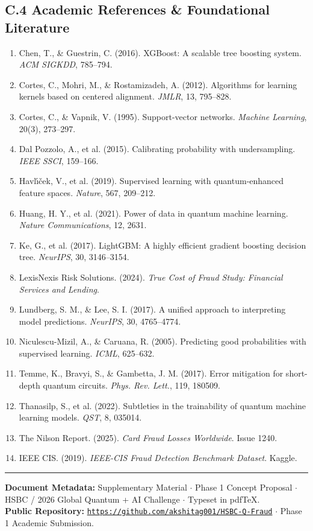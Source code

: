 \documentclass[10pt,a4paper]{article}
\begin{document}
\subsection*{C.4 Academic References \& Foundational Literature}
\begin{enumerate}[leftmargin=*,itemsep=0pt,topsep=0pt]
\item Chen, T., \& Guestrin, C. (2016). XGBoost: A scalable tree boosting system. \textit{ACM SIGKDD}, 785--794.
\item Cortes, C., Mohri, M., \& Rostamizadeh, A. (2012). Algorithms for learning kernels based on centered alignment. \textit{JMLR}, 13, 795--828.
\item Cortes, C., \& Vapnik, V. (1995). Support-vector networks. \textit{Machine Learning}, 20(3), 273--297.
\item Dal Pozzolo, A., et al. (2015). Calibrating probability with undersampling. \textit{IEEE SSCI}, 159--166.
\item Havl{\'\i}{\v{c}}ek, V., et al. (2019). Supervised learning with quantum-enhanced feature spaces. \textit{Nature}, 567, 209--212.
\item Huang, H. Y., et al. (2021). Power of data in quantum machine learning. \textit{Nature Communications}, 12, 2631.
\item Ke, G., et al. (2017). LightGBM: A highly efficient gradient boosting decision tree. \textit{NeurIPS}, 30, 3146--3154.
\item LexisNexis Risk Solutions. (2024). \textit{True Cost of Fraud Study: Financial Services and Lending}.
\item Lundberg, S. M., \& Lee, S. I. (2017). A unified approach to interpreting model predictions. \textit{NeurIPS}, 30, 4765--4774.
\item Niculescu-Mizil, A., \& Caruana, R. (2005). Predicting good probabilities with supervised learning. \textit{ICML}, 625--632.
\item Temme, K., Bravyi, S., \& Gambetta, J. M. (2017). Error mitigation for short-depth quantum circuits. \textit{Phys. Rev. Lett.}, 119, 180509.
\item Thanasilp, S., et al. (2022). Subtleties in the trainability of quantum machine learning models. \textit{QST}, 8, 035014.
\item The Nilson Report. (2025). \textit{Card Fraud Losses Worldwide}. Issue 1240.
\item IEEE CIS. (2019). \textit{IEEE-CIS Fraud Detection Benchmark Dataset}. Kaggle.
\end{enumerate}

\vspace{1.5pt}
\noindent\rule{\linewidth}{0.4pt}
\vspace{1pt}
{\color{darkslate}
\textbf{Document Metadata:} Supplementary Material $\cdot$ Phase 1 Concept Proposal $\cdot$ HSBC / 2026 Global Quantum + AI Challenge $\cdot$ Typeset in pdf\TeX.\\
\textbf{Public Repository:} \href{https://github.com/akshitag001/HSBC-Q-Fraud}{\texttt{https://github.com/akshitag001/HSBC-Q-Fraud}} $\cdot$ Phase 1 Academic Submission.
}
\end{document}

